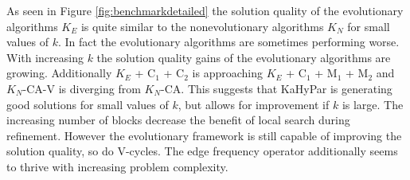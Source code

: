 \documentclass[a4paper,12pt,titlepage, BCOR7mm,headsepline]{scrbook}
\numberwithin{equation}{section}
\begin{document}
As seen in Figure \ref{fig:benchmarkdetailed} the solution quality of the evolutionary algorithms $K_E$ is quite similar to the nonevolutionary algorithms $K_N$ for small values of $k$. In fact the evolutionary algorithms are sometimes performing worse. With increasing $k$ the solution quality gains of the evolutionary algorithms are growing. Additionally $K_E$ + C$_1$ + C$_2$ is approaching $K_E$ + C$_1$ + M$_1$ + M$_2$ and $K_N$-CA-V is diverging from $K_N$-CA. This suggests that KaHyPar is generating good solutions for small values of $k$, but allows for improvement if $k$ is large. The increasing number of blocks 
decrease the benefit of local search during refinement. However the evolutionary framework is still capable of improving the solution quality, so do V-cycles. The edge frequency operator additionally seems to thrive with increasing problem complexity. 
\end{document}
